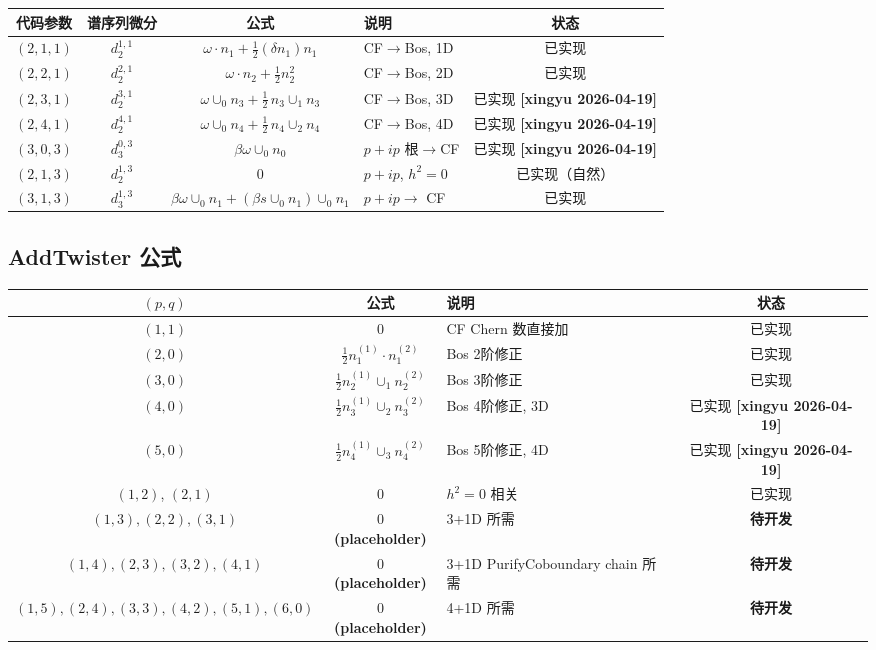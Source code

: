 \documentclass[a4paper,fontset=ubuntu,12pt]{ctexart}
\begin{document}
\begin{center}
\begin{tabular}{c|c|c|l|c}
\hline
代码参数 & 谱序列微分 & 公式 & 说明 & 状态 \\
\hline
$(2,1,1)$ & $d_2^{1,1}$ & $\omega \cdot n_1 + \frac{1}{2}(\delta n_1) n_1$
  & CF$\to$Bos, 1D & 已实现 \\
$(2,2,1)$ & $d_2^{2,1}$ & $\omega \cdot n_2 + \frac{1}{2} n_2^2$
  & CF$\to$Bos, 2D & 已实现 \\
$(2,3,1)$ & $d_2^{3,1}$ & $\omega \cup_0 n_3 + \frac{1}{2}\, n_3 \cup_1 n_3$
  & CF$\to$Bos, 3D & 已实现 \textbf{[xingyu 2026-04-19]} \\
$(2,4,1)$ & $d_2^{4,1}$ & $\omega \cup_0 n_4 + \frac{1}{2}\, n_4 \cup_2 n_4$
  & CF$\to$Bos, 4D & 已实现 \textbf{[xingyu 2026-04-19]} \\
$(3,0,3)$ & $d_3^{0,3}$ & $\beta\omega \cup_0 n_0$
  & $p+ip$ 根$\to$CF & 已实现 \textbf{[xingyu 2026-04-19]} \\
$(2,1,3)$ & $d_2^{1,3}$ & $0$
  & $p+ip$, $h^2=0$ & 已实现（自然） \\
$(3,1,3)$ & $d_3^{1,3}$ & $\beta\omega \cup_0 n_1 + (\beta s \cup_0 n_1)\cup_0 n_1$
  & $p+ip \to$ CF & 已实现 \\
\hline
\end{tabular}
\end{center}

\subsection{AddTwister 公式}

\begin{center}
\begin{tabular}{c|c|l|c}
\hline
$(p, q)$ & 公式 & 说明 & 状态 \\
\hline
$(1,1)$ & $0$ & CF Chern 数直接加 & 已实现 \\
$(2,0)$ & $\frac{1}{2} n_1^{(1)} \cdot n_1^{(2)}$ & Bos 2阶修正 & 已实现 \\
$(3,0)$ & $\frac{1}{2} n_2^{(1)} \cup_1 n_2^{(2)}$ & Bos 3阶修正 & 已实现 \\
$(4,0)$ & $\frac{1}{2} n_3^{(1)} \cup_2 n_3^{(2)}$ & Bos 4阶修正, 3D & 已实现 \textbf{[xingyu 2026-04-19]} \\
$(5,0)$ & $\frac{1}{2} n_4^{(1)} \cup_3 n_4^{(2)}$ & Bos 5阶修正, 4D & 已实现 \textbf{[xingyu 2026-04-19]} \\
$(1,2)$, $(2,1)$ & $0$ & $h^2=0$ 相关 & 已实现 \\
$(1,3), (2,2), (3,1)$ & $0$ \textbf{(placeholder)} & 3+1D 所需 & \textbf{待开发} \\
$(1,4), (2,3), (3,2), (4,1)$ & $0$ \textbf{(placeholder)} & 3+1D PurifyCoboundary chain 所需 & \textbf{待开发} \\
$(1,5), (2,4), (3,3), (4,2), (5,1), (6,0)$ & $0$ \textbf{(placeholder)} & 4+1D 所需 & \textbf{待开发} \\
\hline
\end{tabular}
\end{center}
\end{document}
